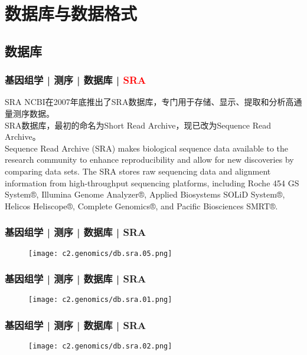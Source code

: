\section{数据库与数据格式}
\subsection{数据库}
\begin{frame}
  \frametitle{基因组学 | 测序 | 数据库 | \textcolor{red}{SRA}}
  \begin{block}{SRA}
NCBI在2007年底推出了SRA数据库，专门用于存储、显示、提取和分析高通量测序数据。\\
\vspace{1em}
SRA数据库，最初的命名为Short Read Archive，现已改为Sequence Read Archive。\\
\vspace{1em}
Sequence Read Archive (SRA) makes biological sequence data available to the research community to enhance reproducibility and allow for new discoveries by comparing data sets. The SRA stores raw sequencing data and alignment information from high-throughput sequencing platforms, including Roche 454 GS System®, Illumina Genome Analyzer®, Applied Biosystems SOLiD System®, Helicos Heliscope®, Complete Genomics®, and Pacific Biosciences SMRT®. 
  \end{block}
\end{frame}
    
\begin{frame}
  \frametitle{基因组学 | 测序 | 数据库 | SRA}
  \begin{figure}
    \centering
    \texttt{[image: c2.genomics/db.sra.05.png]}
  \end{figure}
\end{frame}

\begin{frame}
  \frametitle{基因组学 | 测序 | 数据库 | SRA}
  \begin{figure}
    \centering
    \texttt{[image: c2.genomics/db.sra.01.png]}
  \end{figure}
\end{frame}
    
\begin{frame}
  \frametitle{基因组学 | 测序 | 数据库 | SRA}
  \begin{figure}
    \centering
    \texttt{[image: c2.genomics/db.sra.02.png]}
  \end{figure}
\end{frame}
    
